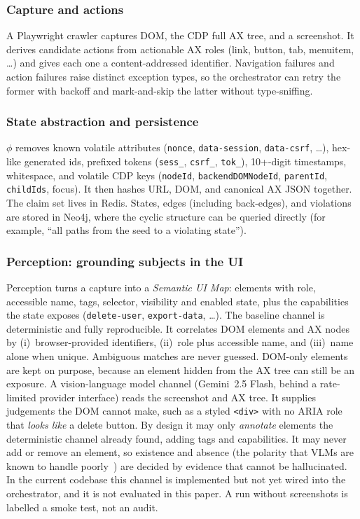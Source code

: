 \subsubsection{Capture and actions}
A Playwright crawler captures DOM, the CDP full AX tree, and a screenshot. It
derives candidate actions from actionable AX roles (link, button, tab,
menuitem, \dots) and gives each one a content-addressed identifier. Navigation
failures and action failures raise distinct exception types, so the
orchestrator can retry the former with backoff and mark-and-skip the latter
without type-sniffing.

\subsubsection{State abstraction and persistence}
$\phi$ removes known volatile attributes (\texttt{nonce},
\texttt{data-session}, \texttt{data-csrf}, \dots), hex-like generated ids,
prefixed tokens (\texttt{sess\_}, \texttt{csrf\_}, \texttt{tok\_}), 10+-digit
timestamps, whitespace, and volatile CDP keys (\texttt{nodeId},
\texttt{backendDOMNodeId}, \texttt{parentId}, \texttt{childIds}, focus). It
then hashes URL, DOM, and canonical AX JSON together. The claim set lives in
Redis. States, edges (including back-edges), and violations are stored in
Neo4j, where the cyclic structure can be queried directly (for example, ``all
paths from the seed to a violating state'').

\subsubsection{Perception: grounding subjects in the UI}
\label{sec:system:perception}
Perception turns a capture into a \emph{Semantic UI Map}: elements with role,
accessible name, tags, selector, visibility and enabled state, plus the
capabilities the state exposes (\texttt{delete-user}, \texttt{export-data},
\dots). The baseline channel is deterministic and fully reproducible. It
correlates DOM elements and AX nodes by (i)~browser-provided identifiers,
(ii)~role plus accessible name, and (iii)~name alone when unique. Ambiguous
matches are never guessed. DOM-only elements are kept on purpose, because an
element hidden from the AX tree can still be an exposure. A vision-language
model channel (Gemini~2.5 Flash, behind a rate-limited provider interface)
reads the screenshot and AX tree. It supplies judgements the DOM cannot make,
such as a styled \texttt{<div>} with no ARIA role that \emph{looks like} a
delete button. By design it may only \emph{annotate} elements the
deterministic channel already found, adding tags and capabilities. It may never
add or remove an element, so existence and absence (the polarity that VLMs are
known to handle poorly~\cite{alhamoud2025negation}) are decided by evidence
that cannot be hallucinated. In the current codebase this channel is
implemented but not yet wired into the orchestrator, and it is not evaluated
in this paper. A run without screenshots is labelled a smoke test, not an
audit.

